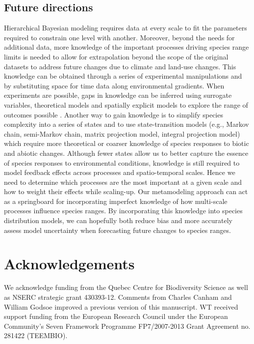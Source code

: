 \documentclass[11pt]{article}
\begin{document}
\subsection*{Future directions}
Hierarchical Bayesian modeling requires data at every scale to fit the parameters required to constrain one level with another.
Moreover, beyond the needs for additional data, more knowledge of the important processes driving species range limits is needed to allow for extrapolation beyond the scope of the original datasets to address future changes due to climate and land-use changes.
This knowledge can be obtained through a series of experimental manipulations and by substituting space for time data along environmental gradients.
When experiments are possible, gaps in knowledge can be inferred using surrogate variables, theoretical models and spatially explicit models to explore the range of outcomes possible \citep{Fortin2012}. 
Another way to gain knowledge is to simplify species complexity into a series of states and to use state-transition models (e.g., Markov chain, semi-Markov chain, matrix projection model, integral projection model) which require more theoretical or coarser knowledge of species responses to biotic and abiotic changes.
Although fewer states allow us to better capture the essence of species responses to environmental conditions, knowledge is still required to model feedback effects across processes and spatio-temporal scales.
Hence we need to determine which processes are the most important at a given scale and how to weight their effects while scaling-up.
Our metamodeling approach can act as a springboard for incorporating imperfect knowledge of how multi-scale processes influence species ranges.
By incorporating this knowledge into species distribution models, we can hopefully both reduce bias and more accurately assess model uncertainty when forecasting future changes to species ranges.

\nolinenumbers
\section*{Acknowledgements}
We acknowledge funding from the Quebec Centre for Biodiversity Science as well as NSERC strategic grant 430393-12. Comments from Charles Canham and William Godsoe improved a previous version of this manuscript. WT received support funding from the European Research Council under the European Community's Seven Framework Programme FP7/2007-2013 Grant Agreement no. 281422 (TEEMBIO). 
\end{document}
